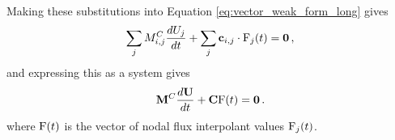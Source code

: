 Making these substitutions into Equation \eqref{eq:vector_weak_form_long} gives
\begin{equation}\label{eq:vector_weak_form}
   \sum\limits_jM^C_{i,j}\frac{dU_j}{dt}
     + \sum\limits_j\mathbf{c}_{i,j}\cdot\mathrm{F}_j(t)
     = \mathbf{0} \,,
\end{equation}
and expressing this as a system gives
\begin{equation}
  \consistentmassmatrix\ddt{\solutionvector}
    + \gradientmatrix\consfluxinterpolant(\timevalue) = \mathbf{0}
  \eqp
\end{equation}
where $\mathrm{F}(t)$ is the vector of nodal flux interpolant values
$\mathrm{F}_j(t)$.

